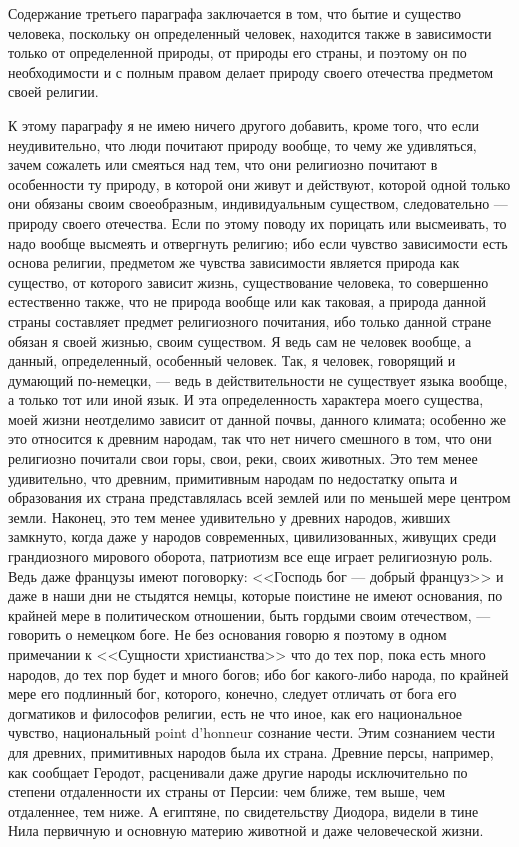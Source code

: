 \documentclass[12pt]{article}
\begin{document}
Содержание третьего параграфа заключается в том, что бытие и существо человека, поскольку он определенный человек, находится также в зависимости только от определенной природы, от природы его страны, и поэтому он по необходимости и с полным правом делает природу своего отечества предметом своей религии. 

К этому параграфу я не имею ничего другого добавить, кроме того, что если неудивительно, что люди почитают природу вообще, то чему же удивляться, зачем сожалеть или смеяться над тем, что они религиозно почитают в особенности ту природу, в которой они живут и действуют, которой одной только они обязаны своим своеобразным, индивидуальным существом, следовательно --- природу своего отечества. Если по этому поводу их порицать или высмеивать, то надо вообще высмеять и отвергнуть религию; ибо если чувство зависимости есть основа религии, предметом же чувства зависимости является природа как существо, от которого зависит жизнь, существование человека, то совершенно естественно также, что не природа вообще или как таковая, а природа данной страны составляет предмет религиозного почитания, ибо только данной стране обязан я своей жизнью, своим существом. Я ведь сам не человек вообще, а данный, определенный, особенный человек. Так, я человек, говорящий и думающий по-немецки, --- ведь в действительности не существует языка вообще, а только тот или иной язык. И эта определенность характера моего существа, моей жизни неотделимо зависит от данной почвы, данного климата; особенно же это относится к древним народам, так что нет ничего смешного в том, что они религиозно почитали свои горы, свои, реки, своих животных. Это тем менее удивительно, что древним, примитивным народам по недостатку опыта и образования их страна представлялась всей землей или по меньшей мере центром земли. Наконец, это тем менее удивительно у древних народов, живших замкнуто, когда даже у народов современных, цивилизованных, живущих среди грандиозного мирового оборота, патриотизм все еще играет религиозную роль. Ведь даже французы имеют поговорку: <<Господь бог --- добрый француз>>  и даже в наши дни не стыдятся немцы, которые поистине не имеют основания, по крайней мере в политическом отношении, быть гордыми своим отечеством, --- говорить о немецком боге. Не без основания говорю я поэтому в одном примечании к <<Сущности христианства>>  что до тех пор, пока есть много народов, до тех пор будет и много богов; ибо бог какого-либо народа, по крайней мере его подлинный бог, которого, конечно, следует отличать от бога его догматиков и философов религии, есть не что иное, как его национальное чувство, национальный point d'honneur сознание чести. Этим сознанием чести для древних, примитивных народов была их страна. Древние персы, например, как сообщает Геродот, расценивали даже другие народы исключительно по степени отдаленности их страны от Персии: чем ближе, тем выше, чем отдаленнее, тем ниже. А египтяне, по свидетельству Диодора, видели в тине Нила первичную и основную материю животной и даже человеческой жизни. 
\end{document}
